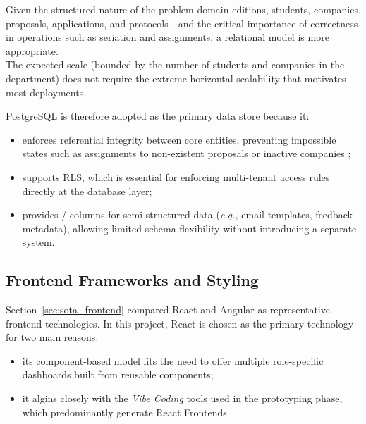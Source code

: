         {
            Given the structured nature of the problem domain-editions, students, companies, proposals, applications, and protocols - and the critical
            importance of correctness in operations such as seriation and assignments, a relational model is more appropriate. \\
            The expected scale (bounded by the number of students and companies in the department) does not require the extreme horizontal
            scalability that motivates most  deployments.
        }
        
        {
            PostgreSQL is therefore adopted as the primary data store because it:
        }
        \begin{itemize}
            \item {enforces referential integrity between core entities, preventing impossible states such
                as assignments to non-existent proposals or inactive companies
            ;}
            \item {
                supports \gls{RLS}, which is essential for enforcing multi-tenant access rules directly at the database layer;
            }
            \item {
                provides / columns for semi-structured data (\textit{e.g.,} email templates, feedback metadata), allowing 
                limited schema flexibility without introducing a separate  system.
            }
        \end{itemize}

    \subsection{Frontend Frameworks and Styling}
        {
            Section~\ref{sec:sota_frontend} compared React and Angular as representative frontend technologies. 
            In this project, React is chosen as the primary  technology for two main reasons:
        }
        \begin{itemize}
            \item {
                its component-based model fits the need to offer multiple role-specific dashboards built from reusable components;
                }
            \item {
                it algins closely with the \textit{Vibe Coding} tools used in the prototyping phase, which predominantly
                generate React Frontends
            }
        \end{itemize}

